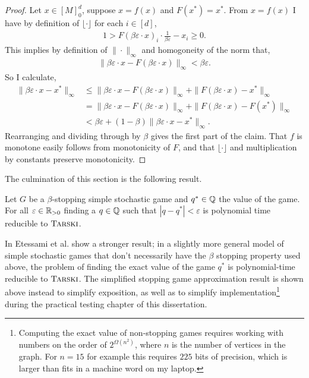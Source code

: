 \newcommand{\bed}{\beta \varepsilon \cdot}
\begin{proof}
  Let $x \in [M]_0^d$, suppose $x = f(x)$ and $F(x^*) = x^*$.
  From $x = f(x)$ I have by definition of $\lfloor \cdot \rfloor$
  for each $i \in [d]$,
  \begin{align*}
  1 > 
    F(\beta \varepsilon \cdot x)_i \cdot \frac{1}{\beta \varepsilon} - x_i
  \geq 0.
  \end{align*}
  This implies by definition of $\|\cdot\|_\infty$ and homogoneity of the norm that,
  \begin{align*}
    \|\beta \varepsilon \cdot x - F(\beta \varepsilon \cdot x) \|_\infty < \beta \varepsilon.
  \end{align*}
  So I calculate,
  \begin{align*}
    \|\bed x - x^* \|_\infty &\leq 
     \| \bed x - F(\bed x)\|_\infty + \|F(\bed x) - x^* \|_\infty  \\
    &= \| \bed x - F(\bed x)\|_\infty + \|F(\bed x) - F(x^*) \|_\infty  \\
    &< \beta \varepsilon + (1 - \beta)\|\bed x - x^*\|_\infty.
  \end{align*}
  Rearranging and dividing through by $\beta$ gives the first part of the claim.
  That $f$ is monotone easily follows from monotonicity of $F$, and that $\lfloor \cdot \rfloor$ and
  multiplication by constants preserve monotonicity.
\end{proof}
The culmination of this section is the following result.
\begin{theorem}
  Let $G$ be a $\beta$-stopping simple stochastic game and $q^* \in \mathbb{Q}$ the value of the game.
  For all $\varepsilon \in \mathbb{R}_{> 0}$ finding a $q \in \mathbb{Q}$ such that $|q - q^*| < \varepsilon$
  is polynomial time reducible to $\textsc{Tarski}$.
\end{theorem}
\begin{remark}
  In \citep{lowerBound} Etessami et al. show a stronger result; in a slightly more general
  model of simple stochastic games that don't necessarily have the $\beta$ stopping property used above,
  the problem of finding the exact value of the game $q^*$ is polynomial-time reducible to $\textsc{Tarski}$.
  The simplified stopping game approximation result is shown above instead to simplify exposition,
  as well as to simplify implementation\footnote{Computing the exact value of non-stopping games requires working with
  numbers on the order of $2^{\Omega(n^2)}$, where $n$ is the number of vertices in the graph. For $n = 15$ for example this requires $225$ bits
  of precision, which is larger than fits in a machine word on my laptop.} during the practical testing chapter of this dissertation.
\end{remark}
